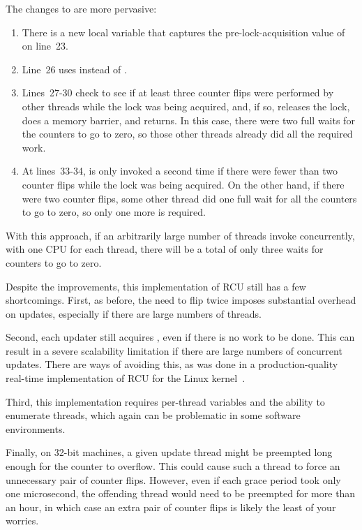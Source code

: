 The changes to  are more pervasive:
\begin{enumerate}
\item	There is a new  local variable that captures
	the pre-lock-acquisition value of  on
	line~23.
\item	Line~26 uses  instead of .
\item	Lines~27-30 check to see if at least three counter flips were
	performed by other threads while the lock was being acquired,
	and, if so, releases the lock, does a memory barrier, and returns.
	In this case, there were two full waits for the counters to
	go to zero, so those other threads already did all the required work.
\item	At lines~33-34,  is only
	invoked a second time if there were fewer than two counter flips
	while the lock was being acquired.
	On the other hand, if there were two counter flips, some other
	thread did one full wait for all the counters to go to zero,
	so only one more is required.
\end{enumerate}

With this approach, if an arbitrarily large number of threads invoke
 concurrently, with one CPU for each thread, there
will be a total of only three waits for counters to go to zero.

Despite the improvements, this implementation of RCU still
has a few shortcomings.
First, as before, the need to flip  twice imposes substantial
overhead on updates, especially if there are large
numbers of threads.

Second, each updater still acquires , even if there
is no work to be done.
This can result in a severe scalability limitation
if there are large numbers of concurrent updates.
There are ways of avoiding this, as was done in a
production-quality real-time implementation of RCU for the Linux
kernel~\cite{PaulEMcKenney2007PreemptibleRCU}.

Third, this implementation requires per-thread variables
and the ability to enumerate threads, which again can be
problematic in some software environments.

Finally, on 32-bit machines, a given update thread might be
preempted long enough for the 
counter to overflow.
This could cause such a thread to force an unnecessary
pair of counter flips.
However, even if each grace period took only one
microsecond, the offending thread would need to be
preempted for more than an hour, in which case an
extra pair of counter flips is likely the least of
your worries.

